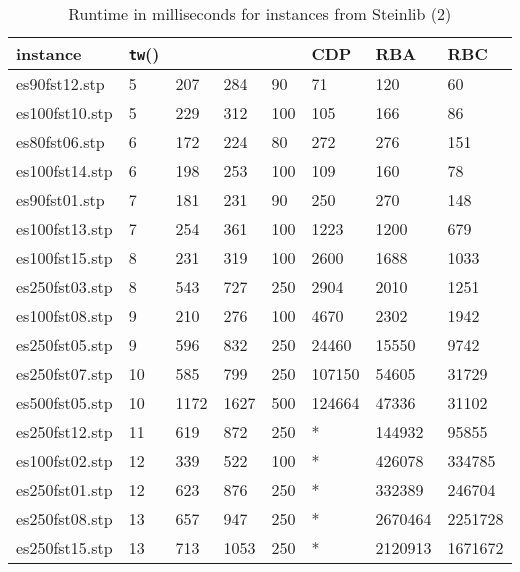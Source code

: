 \documentclass{llncs}
\begin{document}
\begin{table}[!h]
\begin{center}
\begin{tabular}{l l l l l | l l l }
\hline
instance & \texttt{tw}() &  &  &  & CDP & RBA & RBC\\
\hline
\hline
es90fst12.stp	&	5	&	207	&	284	&	90	&	71	&	120	&	60	\\
es100fst10.stp	&	5	&	229	&	312	&	100	&	105	&	166	&	86	\\
es80fst06.stp	&	6	&	172	&	224	&	80	&	272	&	276	&	151	\\
es100fst14.stp	&	6	&	198	&	253	&	100	&	109	&	160	&	78	\\
es90fst01.stp	&	7	&	181	&	231	&	90	&	250	&	270	&	148	\\
es100fst13.stp	&	7	&	254	&	361	&	100	&	1223	&	1200	&	679	\\
es100fst15.stp	&	8	&	231	&	319	&	100	&	2600	&	1688	&	1033	\\
es250fst03.stp	&	8	&	543	&	727	&	250	&	2904	&	2010	&	1251	\\
es100fst08.stp	&	9	&	210	&	276	&	100	&	4670	&	2302	&	1942	\\
es250fst05.stp	&	9	&	596	&	832	&	250	&	24460	&	15550	&	9742	\\
es250fst07.stp	&	10	&	585	&	799	&	250	&	107150	&	54605	&	31729	\\
es500fst05.stp	&	10	&	1172	&	1627	&	500	&	124664	&	47336	&	31102	\\
es250fst12.stp	&	11	&	619 	&	872	&	250	&	*	&	144932 & 	95855\\
es100fst02.stp	&	12	&	339	&	522	&	100	&	*	&	426078 &	334785\\
es250fst01.stp	&	12	&	623	&	876	&	250	&	*	&	332389 & 	246704\\
es250fst08.stp	&	13	&	657	&	947	&	250	&	*	&	2670464 &	2251728\\
es250fst15.stp	&	13	&	713	&	1053	&	250	&	*	&	2120913 &	1671672\\
\hline
\end{tabular}
\end{center}
\caption{Runtime in milliseconds for instances from Steinlib (2)}
\label{t1:b}
\end{table}
\end{document}
